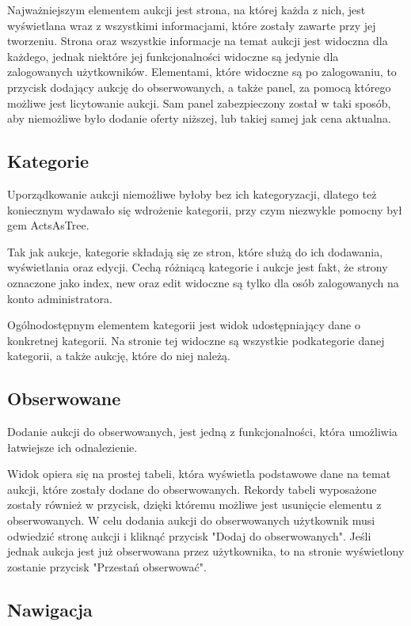 \documentclass[brudnopis]{xmgr}
\begin{document}
Najważniejszym elementem aukcji jest strona, na której każda z nich, jest wyświetlana wraz z wszystkimi informacjami, które zostały zawarte przy jej tworzeniu. Strona oraz wszystkie informacje na temat aukcji jest widoczna dla każdego, jednak niektóre jej funkcjonalności widoczne są jedynie dla zalogowanych użytkowników. Elementami, które widoczne są po zalogowaniu, to przycisk dodający aukcję do obserwowanych, a także panel, za pomocą którego możliwe jest licytowanie aukcji. Sam panel zabezpieczony został w taki sposób, aby niemożliwe było dodanie oferty niższej, lub takiej samej jak cena aktualna.

\subsection{Kategorie}

Uporządkowanie aukcji niemożliwe byłoby bez ich kategoryzacji, dlatego też koniecznym wydawało się wdrożenie kategorii, przy czym niezwykle pomocny był gem ActsAsTree.

Tak jak aukcje, kategorie składają się ze stron, które służą do ich dodawania, wyświetlania oraz edycji. Cechą różniącą kategorie i aukcje jest fakt, że strony oznaczone jako index, new oraz edit widoczne są tylko dla osób zalogowanych na konto administratora.

Ogólnodostępnym elementem kategorii jest widok udostępniający dane o konkretnej kategorii. Na stronie tej widoczne są wszystkie podkategorie danej kategorii, a także aukcję, które do niej należą.

\subsection{Obserwowane}

Dodanie aukcji do obserwowanych, jest jedną z funkcjonalności, która umożliwia łatwiejsze ich odnalezienie.

Widok opiera się na prostej tabeli, która wyświetla podstawowe dane na temat aukcji, które zostały dodane do obserwowanych. Rekordy tabeli wyposażone zostały również w przycisk, dzięki któremu możliwe jest usunięcie elementu z obserwowanych. W celu dodania aukcji do obserwowanych użytkownik musi odwiedzić stronę aukcji i kliknąć przycisk "Dodaj do obserwowanych". Jeśli jednak aukcja jest już obserwowana przez użytkownika, to na stronie wyświetlony zostanie przycisk "Przestań obserwować".

\subsection{Nawigacja}
\end{document}
